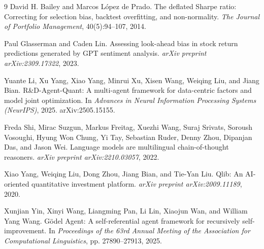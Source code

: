 \documentclass{article}
\begin{document}
\begin{thebibliography}{9}
David H. Bailey and Marcos L\'opez de Prado.
\newblock The deflated Sharpe ratio: Correcting for selection bias, backtest overfitting, and non-normality.
\newblock \emph{The Journal of Portfolio Management}, 40(5):94--107, 2014.

Paul Glasserman and Caden Lin.
\newblock Assessing look-ahead bias in stock return predictions generated by GPT sentiment analysis.
\newblock \emph{arXiv preprint arXiv:2309.17322}, 2023.

Yuante Li, Xu Yang, Xiao Yang, Minrui Xu, Xisen Wang, Weiqing Liu, and Jiang Bian.
\newblock R\&D-Agent-Quant: A multi-agent framework for data-centric factors and model joint optimization.
\newblock In \emph{Advances in Neural Information Processing Systems (NeurIPS)}, 2025. arXiv:2505.15155.

Freda Shi, Mirac Suzgun, Markus Freitag, Xuezhi Wang, Suraj Srivats, Soroush Vosoughi, Hyung Won Chung, Yi Tay, Sebastian Ruder, Denny Zhou, Dipanjan Das, and Jason Wei.
\newblock Language models are multilingual chain-of-thought reasoners.
\newblock \emph{arXiv preprint arXiv:2210.03057}, 2022.

Xiao Yang, Weiqing Liu, Dong Zhou, Jiang Bian, and Tie-Yan Liu.
\newblock Qlib: An AI-oriented quantitative investment platform.
\newblock \emph{arXiv preprint arXiv:2009.11189}, 2020.

Xunjian Yin, Xinyi Wang, Liangming Pan, Li Lin, Xiaojun Wan, and William Yang Wang.
\newblock G\"odel Agent: A self-referential agent framework for recursively self-improvement.
\newblock In \emph{Proceedings of the 63rd Annual Meeting of the Association for Computational Linguistics}, pp. 27890--27913, 2025.
\end{thebibliography}
\end{document}
